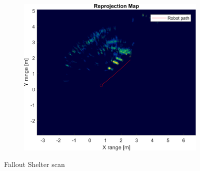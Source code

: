 \begin{figure}[htbp]
\begin{subfigure}[t]{0.5\linewidth}
        \includegraphics[width=\linewidth,max height=.475\textheight]{gfx/results/falloutshelter_reprojection.png}
    \end{subfigure}%
    \caption{Fallout Shelter scan}
\end{figure}

